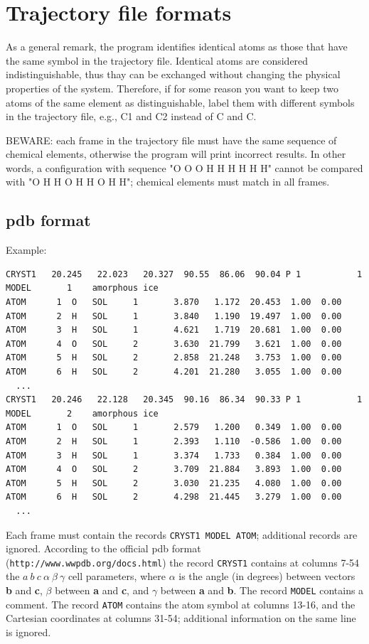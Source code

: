 \documentclass[a4paper,11pt]{article}
\begin{document}
\newpage

\section{Trajectory file formats}

As a general remark, the program identifies identical atoms as those that have the same symbol in the trajectory file. 
Identical atoms are considered indistinguishable, thus thay can be exchanged without changing the physical properties of the system.
Therefore, if for some reason you want to keep two atoms of the same element as distinguishable, label them with different symbols in the 
trajectory file, e.g., C1 and C2 instead of C and C.

BEWARE: each frame in the trajectory file must have the same sequence of chemical elements, otherwise the program will print
incorrect results. 
In other words, a configuration with sequence "O O O H H H H H H" cannot be compared with "O H H O H H O H H"; chemical elements 
must match in all frames.

\subsection{pdb format}

Example:
\begingroup\fontsize{8pt}{12pt}\selectfont
\begin{verbatim}
CRYST1   20.245   22.023   20.327  90.55  86.06  90.04 P 1           1
MODEL       1    amorphous ice
ATOM      1  O   SOL     1       3.870   1.172  20.453  1.00  0.00            
ATOM      2  H   SOL     1       3.840   1.190  19.497  1.00  0.00            
ATOM      3  H   SOL     1       4.621   1.719  20.681  1.00  0.00            
ATOM      4  O   SOL     2       3.630  21.799   3.621  1.00  0.00            
ATOM      5  H   SOL     2       2.858  21.248   3.753  1.00  0.00            
ATOM      6  H   SOL     2       4.201  21.280   3.055  1.00  0.00
  ...
CRYST1   20.246   22.128   20.345  90.16  86.34  90.33 P 1           1
MODEL       2    amorphous ice
ATOM      1  O   SOL     1       2.579   1.200   0.349  1.00  0.00
ATOM      2  H   SOL     1       2.393   1.110  -0.586  1.00  0.00
ATOM      3  H   SOL     1       3.374   1.733   0.384  1.00  0.00
ATOM      4  O   SOL     2       3.709  21.884   3.893  1.00  0.00
ATOM      5  H   SOL     2       3.030  21.235   4.080  1.00  0.00
ATOM      6  H   SOL     2       4.298  21.445   3.279  1.00  0.00
  ...
\end{verbatim}
\endgroup
Each frame must contain the records \texttt{CRYST1 MODEL ATOM}; additional records are ignored.
According to the official pdb format (\texttt{http://www.wwpdb.org/docs.html}) the record \texttt{CRYST1}
contains at columns 7-54 the $a\ b\ c\ \alpha\ \beta\ \gamma$ cell parameters,
where $\alpha$ is the angle (in degrees) between vectors \textbf{b} and \textbf{c},
$\beta$ between \textbf{a} and \textbf{c}, and $\gamma$ between \textbf{a} and \textbf{b}.
The record \texttt{MODEL} contains a comment.
The record \texttt{ATOM} contains the atom symbol at columns 13-16, and the Cartesian coordinates at columns 31-54; additional 
information on the same line is ignored.
\end{document}
